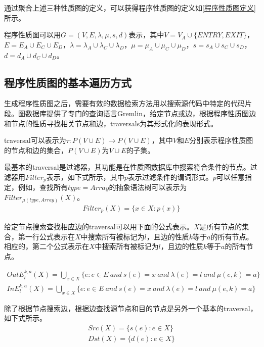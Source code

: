 {通过聚合上述三种性质图的定义，可以获得程序性质图的定义如\ref{程序性质图定义}所示。

\begin{definition}
\label{程序性质图定义}
程序性质图可以用$G=(V,E,\lambda, \mu, s, d)$表示，其中$V=V_{A} \cup \{ENTRY, EXIT\}$，$E = E_{A} \cup E_{C} \cup E_{D}$，$\lambda = \lambda_{A} \cup \lambda_{C} \cup \lambda_{D} $，$\mu = \mu_{A} \cup \mu_{C} \cup \mu_{D}$，$s = s_{A} \cup s_{C} \cup s_{D}$，$d = d_{A} \cup d_{C} \cup d_{D}$。
\end{definition}

\subsection{程序性质图的基本遍历方式}
\label{程序性质图的基本遍历方式}
生成程序性质图之后，需要有效的数据检索方法用以搜索源代码中特定的代码片段。图数据库提供了专门的查询语言Gremlin，给定节点或边，根据程序性质图边和节点的性质寻找相关节点和边，traversals为其形式化的表现形式。

\begin{definition}
\label{traversal定义}
traversal可以表示为$\tau : P(V \cup E) \rightarrow P(V \cup E)$，其中$V$和$E$分别表示程序性质图的节点和边的集合，$P(V \cup E)$为$V \cup E$的子集。
\end{definition}

最基本的traversal是过滤器，其功能是在性质图数据库中搜索符合条件的节点。过滤器用$Filter_{p}$表示，如下式所示，其中$p$表示过滤条件的谓词形式。$p$可以任意指定，例如，查找所有$type=Array$的抽象语法树可以表示为$Filter_{\mu(type,Array)}(X)$。
\begin{align*}
Filter_{p} (X) = \{x \in X : p(x) \}
\end{align*}


给定节点搜索查找相应边的traversal可以用下面的公式表示。$X$是所有节点的集合，第一行公式表示在$X$中搜索所有被标记为$l$，且边的性质$k$等于$a$的所有节点。相应的，第二个公式表示在$X$中搜索所有被标记为$l$，且边的性质$k$等于$a$的所有节点。

\begin{align*}
OutE^{k,a}_{l}(X) = \bigcup_{x \in X} \{e: e \in E \ and\ s(e)=x \ and \ \lambda(e) = l \ and \ \mu(e,k) = a \} \\
InE^{k,a}_{l}(X) = \bigcup_{x \in X} \{e: e \in E \ and\ s(e)=x \ and \ \lambda(e) = l \ and \ \mu(e,k) = a \}
\end{align*}

除了根据节点搜索边，根据边查找源节点和目的节点是另外一个基本的traversal，如下式所示。
\begin{align*}
Src(X) = \{s(e): e \in X \} \\
Dst(X) = \{d(e): e \in X \} 
\end{align*}

}
